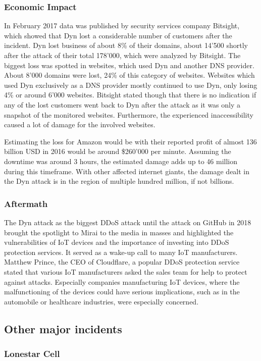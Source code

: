 	\subsubsection{Economic Impact}
	In February 2017 data was published by security services company Bitsight, which showed that Dyn lost a considerable number of customers after the incident. Dyn lost business of about 8\% of their domains, about 14'500 shortly after the attack of their total 178'000, which were analyzed by Bitsight. 
The biggest loss was spotted in websites, which used Dyn and another DNS provider. About 8'000 domains were lost, 24\% of this category of websites. Websites which used Dyn exclusively as a DNS provider mostly continued to use Dyn, only losing 4\% or around 6'000 websites. Bitsight stated though that there is no indication if any of the lost customers went back to Dyn after the attack as it was only a snapshot of the monitored websites.
Furthermore, the experienced inaccessibility caused a lot of damage for the involved websites. 

Estimating the loss for Amazon would be with their reported profit of almost 136 billion USD in 2016 would be around \$260'000 per minute. Assuming the downtime was around 3 hours, the estimated damage adds up to 46 million during this timeframe. With other affected internet giants, the damage dealt in the Dyn attack is in the region of multiple hundred million, if not billions.

	\subsubsection{Aftermath}
	The Dyn attack as the biggest DDoS attack until the attack on GitHub in 2018 brought the spotlight to Mirai to the media in masses and highlighted the vulnerabilities of IoT devices and the importance of investing into DDoS protection services. It served as a wake-up call to many IoT manufacturers. Matthew Prince, the CEO of Cloudflare, a popular DDoS protection service stated that various IoT manufacturers asked the sales team for help to protect against attacks. Especially companies manufacturing IoT devices, where the malfunctioning of the devices could have serious implications, such as in the automobile or healthcare industries, were especially concerned.
	
	\subsection{Other major incidents}
	\subsubsection{Lonestar Cell}
